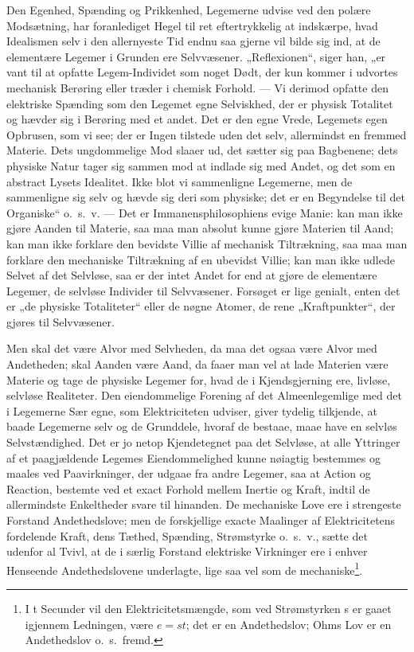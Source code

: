 \documentclass[12pt,a4paper]{book}
\begin{document}
Den Egenhed, Spænding og Prikkenhed, Legemerne udvise ved den polære
Modsætning, har foranlediget Hegel til ret eftertrykkelig at
indskærpe, hvad Idealismen selv i den allernyeste Tid endnu saa gjerne
vil bilde sig ind, at de elementære Legemer i Grunden ere
Selvvæsener. „Reflexionen“, siger han, „er vant til at opfatte
Legem-Individet som noget Dødt, der kun kommer i udvortes mechanisk
Berøring eller træder i chemisk Forhold. --- Vi derimod opfatte den
elektriske Spænding som den Legemet egne Selviskhed, der er physisk
Totalitet og hævder sig i Berøring med et andet. Det er den egne
Vrede, Legemets egen Opbrusen, som vi see; der er Ingen tilstede uden
det selv, allermindst en fremmed Materie. Dets ungdommelige Mod slaaer
ud, det sætter sig paa Bagbenene; dets physiske Natur tager sig sammen
mod at indlade sig med Andet, og det som en abstract Lysets Idealitet.
Ikke blot vi sammenligne Legemerne, men de sammenligne sig selv og
hævde sig deri som physiske; det er en Begyndelse til det Organiske“
o.\ s.\ v. --- Det er Immanensphilosophiens evige Manie: kan man ikke
gjøre Aanden til Materie, saa maa man absolut kunne gjøre Materien til
Aand; kan man ikke forklare den bevidste Villie af mechanisk
Tiltrækning, saa maa man forklare den mechaniske Tiltrækning af en
ubevidst Villie; kan man ikke udlede Selvet af det Selvløse, saa er
der intet Andet for end at gjøre de elementære Legemer, de selvløse
Individer til Selvvæsener. Forsøget er lige genialt, enten det er „de
physiske Totaliteter“ eller de nøgne Atomer, de rene „Kraftpunkter“,
der gjøres til Selvvæsener.

Men skal det være Alvor med Selvheden, da maa det ogsaa være Alvor med
Andetheden; skal Aanden være Aand, da faaer man vel at lade Materien
være Materie og tage de physiske Legemer for, hvad de i Kjendsgjerning
ere, livløse, selvløse Realiteter. Den eiendommelige Forening af det
Almeenlegemlige med det i Legemerne Sær\-%
egne, som Elektriciteten udviser, giver tydelig tilkjende, at baade
Legemerne selv og de Grunddele, hvoraf de bestaae, maae have en
selvløs Selvstændighed. Det er jo netop Kjendetegnet paa det Selvløse,
at alle Yttringer af et paagjældende Legemes Eiendommelighed kunne
nøiagtig bestemmes og maales ved Paavirkninger, der udgaae fra andre
Legemer, saa at Action og Reaction, bestemte ved et exact Forhold
mellem Inertie og Kraft, indtil de allermindste Enkeltheder svare til
hinanden. De mechaniske Love ere i strengeste Forstand Andethedslove;
men de forskjellige exacte Maalinger af Elektricitetens fordelende
Kraft, dens Tæthed, Spænding, Strømstyrke o.\ s.\ v., sætte det
udenfor al Tvivl, at de i særlig Forstand elektriske Virkninger ere i
enhver Henseende Andethedslovene underlagte, lige saa vel som de
mechaniske\footnote{%
I t Secunder vil den Elektricitetsmængde, som ved Strømstyrken s er
gaaet igjennem Ledningen, være $e = st$; det er en Andethedslov; Ohms
Lov er en Andethedslov o.\ s.\ fremd.}.
\end{document}
